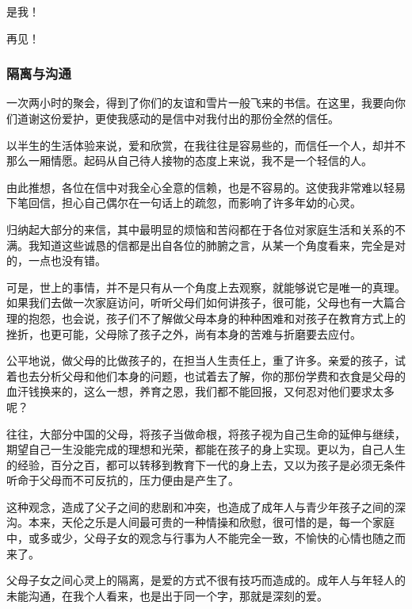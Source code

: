 \par {}
\par 是我！
\par 再见！
\par {}


\subsubsection{隔离与沟通}

\par {}
\par 一次两小时的聚会，得到了你们的友谊和雪片一般飞来的书信。在这里，我要向你们道谢这份爱护，更使我感动的是信中对我付出的那份全然的信任。
\par 以半生的生活体验来说，爱和欣赏，在我往往是容易些的，而信任一个人，却并不那么一厢情愿。起码从自己待人接物的态度上来说，我不是一个轻信的人。
\par 由此推想，各位在信中对我全心全意的信赖，也是不容易的。这使我非常难以轻易下笔回信，担心自己偶尔在一句话上的疏忽，而影响了许多年幼的心灵。
\par 归纳起大部分的来信，其中最明显的烦恼和苦闷都在于各位对家庭生活和关系的不满。我知道这些诚恳的信都是出自各位的肺腑之言，从某一个角度看来，完全是对的，一点也没有错。
\par 可是，世上的事情，并不是只有从一个角度上去观察，就能够说它是唯一的真理。如果我们去做一次家庭访问，听听父母们如何讲孩子，很可能，父母也有一大篇合理的抱怨，也会说，孩子们不了解做父母本身的种种困难和对孩子在教育方式上的挫折，也更可能，父母除了孩子之外，尚有本身的苦难与折磨要去应付。
\par 公平地说，做父母的比做孩子的，在担当人生责任上，重了许多。亲爱的孩子，试着也去分析父母和他们本身的问题，也试着去了解，你的那份学费和衣食是父母的血汗钱换来的，这么一想，养育之恩，我们都不能回报，又何忍对他们要求太多呢？
\par 往往，大部分中国的父母，将孩子当做命根，将孩子视为自己生命的延伸与继续，期望自己一生没能完成的理想和光荣，都能在孩子的身上实现。更以为，自己人生的经验，百分之百，都可以转移到教育下一代的身上去，又以为孩子是必须无条件听命于父母而不可反抗的，压力便由是产生了。
\par 这种观念，造成了父子之间的悲剧和冲突，也造成了成年人与青少年孩子之间的深沟。本来，天伦之乐是人间最可贵的一种情操和欣慰，很可惜的是，每一个家庭中，或多或少，父母子女的观念与行事为人不能完全一致，不愉快的心情也随之而来了。
\par 父母子女之间心灵上的隔离，是爱的方式不很有技巧而造成的。成年人与年轻人的未能沟通，在我个人看来，也是出于同一个字，那就是深刻的爱。
